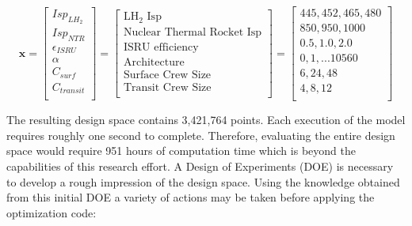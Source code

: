 \documentclass[]{aiaa-pretty}
\begin{document}
\begin{equation*}
\mathbf{x}=
\begin{bmatrix}
Isp_{LH_2}\\
Isp_{NTR}\\
\epsilon_{ISRU}\\
\alpha\\
C_{surf}\\
C_{transit}\\
\end{bmatrix}
=
\begin{bmatrix}
\mbox{LH}_2\mbox{ Isp}\\
\mbox{Nuclear Thermal Rocket Isp}\\
\mbox{ISRU efficiency}\\
\mbox{Architecture}\\
\mbox{Surface Crew Size}\\
\mbox{Transit Crew Size}\\
\end{bmatrix}
=
\begin{bmatrix}
445,452,465,480\\
850,950,1000\\
0.5,1.0,2.0\\
0,1,...10560\\
6,24,48\\
4,8,12\\
\end{bmatrix}
\end{equation*}

The resulting design space contains 3,421,764 points. Each execution of the model requires roughly
one second to complete. Therefore, evaluating the entire design space would require 951 hours of computation time which is beyond the capabilities of this research effort. A Design of Experiments (DOE) is necessary to develop a rough impression of the design space. Using the knowledge obtained from this initial DOE a variety of actions may be taken before applying the optimization code:
\end{document}
